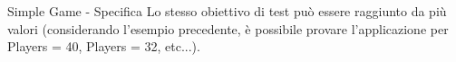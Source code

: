 \begin{example}{}{Simple Game - Specifica}
    Lo stesso obiettivo di test può essere raggiunto da più valori (considerando l'esempio precedente, è possibile provare l'applicazione per Players = 40, Players = 32, etc...).

\end{example}